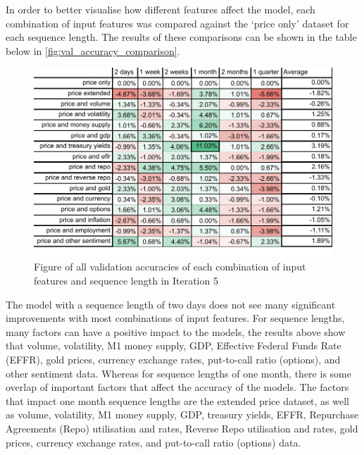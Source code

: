 In order to better visualise how different features affect the model, each combination of input features was compared against the `price only' dataset for each sequence length.
The results of these comparisons can be shown in the table below in \autoref{fig:val_accuracy_comparison}.

\begin{figure}[ht]
    \centering
    \includegraphics[width=0.95\columnwidth]{figures/results/final/val_accuracy_comparison.pdf}
    \caption[Best validation accuracies for Iteration 5]{Figure of all validation accuracies of each combination of input features and sequence length in Iteration 5}
    \label{fig:val_accuracy_comparison}
\end{figure}
\FloatBarrier

The model with a sequence length of two days does not see many significant improvements with most combinations of input features.
For sequence lengths, many factors can have a positive impact to the models, the results above show that volume, volatility,
M1 money supply, GDP, Effective Federal Funds Rate (EFFR), gold prices, currency exchange rates, put-to-call ratio (options), and other
sentiment data. Whereas for sequence lengths of one month, there is some overlap of important factors that affect the accuracy of the models.
The factors that impact one month sequence lengths are the extended price dataset, as well as volume, volatility, M1 money supply, GDP, 
treasury yields, EFFR, Repurchase Agreements (Repo) utilisation and rates, Reverse Repo utilisation and rates, gold prices, currency exchange rates,
and put-to-call ratio (options) data.

